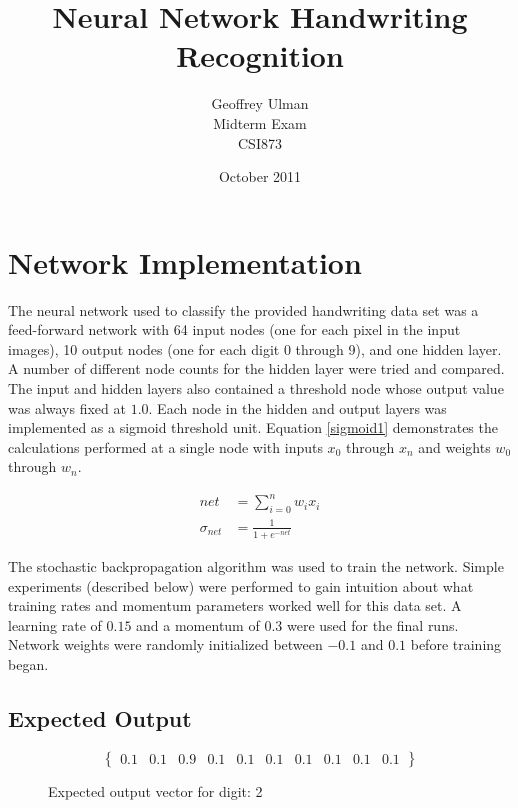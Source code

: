 \documentclass{article}
\begin{document}
\title{Neural Network Handwriting Recognition}
\author{Geoffrey Ulman\\
        Midterm Exam\\
        CSI873}
\date{October 2011}
\maketitle

\tableofcontents

\section{Network Implementation}\label{Network Parameters}

The neural network used to classify the provided handwriting data set was a feed-forward network with 64 input nodes (one for each pixel in the input images), 10 output nodes (one for each digit 0 through 9), and one hidden layer. A number of different node counts for the hidden layer were tried and compared. The input and hidden layers also contained a threshold node whose output value was always fixed at \(1.0\). Each node in the hidden and output layers was implemented as a sigmoid threshold unit. Equation \ref{sigmoid1} demonstrates the calculations performed at a single node with inputs \(x_{0}\) through \(x_{n}\) and weights \(w_{0}\) through \(w_{n}\).

\begin{equation}\label{sigmoid1}
\begin{split}
net &= \sum\limits_{i=0}^n w_{i}x_{i}\\
\sigma_{net} &= \frac{1}{1+e^{-net}}
\end{split}
\end{equation}

The stochastic backpropagation algorithm was used to train the network. Simple experiments (described below) were performed to gain intuition about what training rates and momentum parameters worked well for this data set. A learning rate of \(0.15\) and a momentum of \(0.3\) were used for the final runs. Network weights were randomly initialized between \(-0.1\) and \(0.1\) before training began.

\subsection{Expected Output}

\begin{figure}\label{expected1}
\[ \begin{Bmatrix} 0.1 & 0.1 & 0.9 & 0.1 & 0.1 & 0.1 & 0.1 & 0.1 & 0.1 & 0.1 \end{Bmatrix} \]
\caption{Expected output vector for digit: 2}
\end{figure}
\end{document}
